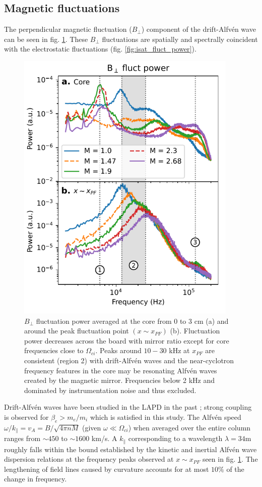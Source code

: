 \subsection{Magnetic fluctuations}
The perpendicular magnetic fluctuation ($B_\perp$) component of the drift-Alfvén wave can be seen in fig. \ref{fig:bperp_fluct}. These $B_\perp$ fluctuations are spatially and spectrally coincident with the electrostatic fluctuations (fig. \ref{fig:isat_fluct_power}).
\begin{figure}
    \centering
    \includegraphics[width=300pt]{figures/fig13.pdf}
    \caption[$B_\perp$ fluctuation power spectra at various locations]{$B_\perp$ fluctuation power averaged at the core from 0 to 3 cm (a) and around the peak fluctuation point $(x \sim x_{PF})$ (b). Fluctuation power decreases across the board with mirror ratio except for core frequencies close to $\Omega_{ci}$. Peaks around $10-30$ kHz at $x_{PF}$ are consistent (region 2) with drift-Alfvén waves and the near-cyclotron frequency features in the core may be resonating Alfvén waves created by the magnetic mirror. Frequencies below 2 kHz and dominated by instrumentation noise and thus excluded.}
    \label{fig:bperp_fluct}
\end{figure}
Drift-Alfvén waves have been studied in the LAPD in the past \cite{Maggs_1997, Vincena_2006}; strong coupling is observed for $\beta_e > m_e / m_i$ which is satisfied in this study. The Alfvén speed $\omega / k_\parallel = v_A = B/\sqrt{4 \pi n M}$ (given $\omega \ll \Omega_{ci}$) when averaged over the entire column ranges from $\sim 450$ to $\sim 1600$ km/s. A $k_\parallel$ corresponding to a wavelength $\lambda = 34$m roughly falls within the bound established by the kinetic and inertial Alfvén wave dispersion relations at the frequency peaks observed at $x \sim x_{PF}$ seen in fig. \ref{fig:bperp_fluct}. The lengthening of field lines caused by curvature accounts for at most $10\%$ of the change in frequency.

